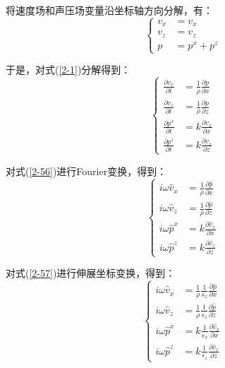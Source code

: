 \documentclass[12pt]{article}
\begin{document}
\par
将速度场和声压场变量沿坐标轴方向分解，有：
\begin{equation}\label{2-55}
\left\{ 
\begin{aligned}
v_x & = v_x\\
v_z & = v_z\\
p & =p^x+p^z
\end{aligned}
\right. 
\end{equation}
\par
于是，对式(\ref{2-1})分解得到：
\begin{equation}\label{2-56}
\left\{ 
\begin{aligned}
\frac{\partial v_x}{\partial t} & = \frac{1}{\rho}\frac{\partial p}{\partial x}\\
\frac{\partial v_z}{\partial t} & = \frac{1}{\rho}\frac{\partial p}{\partial z}\\
\frac{\partial p^x}{\partial t} & = k\frac{\partial v_x}{\partial x}\\
\frac{\partial p^z}{\partial t} & = k\frac{\partial v_z}{\partial z}
\end{aligned}
\right.
\end{equation}
\par
对式(\ref{2-56})进行Fourier变换，得到：
\begin{equation}\label{2-57}
\left\{ 
\begin{aligned}
i\omega \hat{v}_x & = \frac{1}{\rho}\frac{\partial \hat{p}}{\partial x}\\
i\omega \hat{v}_z & = \frac{1}{\rho}\frac{\partial \hat{p}}{\partial z}\\
i\omega \hat{p}^x & = k\frac{\partial \hat{v}_x}{\partial x}\\
i\omega \hat{p}^z & = k\frac{\partial \hat{v}_z}{\partial z}
\end{aligned}
\right.
\end{equation}
\par
对式(\ref{2-57})进行伸展坐标变换，得到：
\begin{equation}\label{2-58}
\left\{ 
\begin{aligned}
i\omega \hat{v}_x & = \frac{1}{\rho}\frac{1}{s_x}\frac{\partial \hat{p}}{\partial x}\\
i\omega \hat{v}_z & = \frac{1}{\rho}\frac{1}{s_z}\frac{\partial \hat{p}}{\partial z}\\
i\omega \hat{p}^x & = k\frac{1}{s_x}\frac{\partial \hat{v}_x}{\partial x}\\
i\omega \hat{p}^z & = k\frac{1}{s_z}\frac{\partial \hat{v}_z}{\partial z}
\end{aligned}
\right.
\end{equation}
\end{document}
